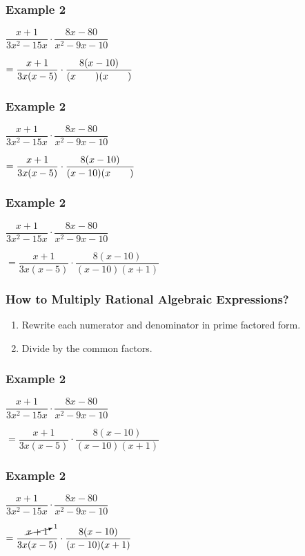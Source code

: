 \documentclass[14pt]{beamer}
\begin{document}
    \begin{frame}
    	\frametitle{Example 2}
    	$\dfrac{x + 1}{3x^2 - 15x} \cdot \dfrac{8x -80}{x^2 - 9x - 10}$ 
    	
    	\vspace{1em} $= \dfrac{x + 1}{ 3x(x -5)} \cdot \dfrac{8 (x -10)}{ (x\text{\hspace{2em}})(x\text{\hspace{2em}})}$
    \end{frame}

     \begin{frame}
    	\frametitle{Example 2}
    	$\dfrac{x + 1}{3x^2 - 15x} \cdot \dfrac{8x -80}{x^2 - 9x - 10}$ 
    	
    	\vspace{1em} $= \dfrac{x + 1}{ 3x(x -5)} \cdot \dfrac{8 (x -10)}{ (x -10)(x\text{\hspace{2em}})}$
    \end{frame}

    \begin{frame}
    	\frametitle{Example 2}
    	$\dfrac{x + 1}{3x^2 - 15x} \cdot \dfrac{8x -80}{x^2 - 9x - 10}$ 
    	
    	\vspace{1em} $= \dfrac{x + 1}{ 3x(x -5)} \cdot \dfrac{8 (x -10)}{ (x -10)(x + 1)}$
    \end{frame}

     \begin{frame}
     	\frametitle{How to Multiply Rational Algebraic Expressions?}
     	\begin{enumerate}
     		\item Rewrite each numerator and denominator in prime factored form.
     		\item Divide by the common factors.
     	\end{enumerate}
     \end{frame}
 
     \begin{frame}
     	\frametitle{Example 2}
     	$\dfrac{x + 1}{3x^2 - 15x} \cdot \dfrac{8x -80}{x^2 - 9x - 10}$ 
     	
     	\vspace{1em} $= \dfrac{x + 1}{ 3x(x -5)} \cdot \dfrac{8 (x -10)}{ (x -10)(x + 1)}$
     \end{frame}
 
     \begin{frame}
     	\frametitle{Example 2}
     	$\dfrac{x + 1}{3x^2 - 15x} \cdot \dfrac{8x -80}{x^2 - 9x - 10}$ 
     	
     	\vspace{1em} $= \dfrac{\cancelto{1}{x + 1}}{ 3x(x -5)} \cdot \dfrac{8 (x -10)}{ (x -10)(x + 1)}$
     \end{frame}
 
\end{document}
